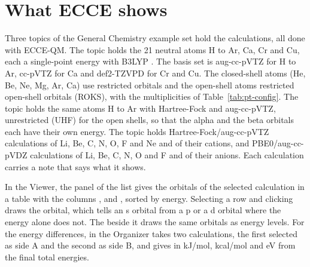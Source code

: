 \section{What ECCE shows}
Three topics of the General Chemistry example set hold the calculations, all done with ECCE-QM.
The topic  holds the 21 neutral atoms H to Ar, Ca, Cr and Cu, each a single-point energy with B3LYP \cite{becke1993}. The basis set is aug-cc-pVTZ \cite{kendall1992,woon1993} for H to Ar, cc-pVTZ for Ca and def2-TZVPD \cite{rappoport2010} for Cr and Cu. The closed-shell atoms (He, Be, Ne, Mg, Ar, Ca) use restricted orbitals and the open-shell atoms restricted open-shell orbitals (ROKS), with the multiplicities of Table~\ref{tab:pt-config}.
The topic  holds the same atoms H to Ar with Hartree-Fock and aug-cc-pVTZ, unrestricted (UHF) for the open shells, so that the alpha and the beta orbitals each have their own energy. The topic  holds Hartree-Fock/aug-cc-pVTZ calculations of Li, Be, C, N, O, F and Ne and of their cations, and PBE0/aug-cc-pVDZ \cite{adamo1999} calculations of Li, Be, C, N, O and F and of their anions.
Each calculation carries a note that says what it shows.

In the Viewer, the  panel of the  list gives the orbitals of the selected calculation in a table with the columns ,  and , sorted by energy. Selecting a row and clicking  draws the orbital, which tells an s orbital from a p or a d orbital where the energy alone does not. The  beside it draws the same orbitals as energy levels.
For the energy differences,  in the Organizer takes two calculations, the first selected as side A and the second as side B, and gives  in kJ/mol, kcal/mol and eV from the final total energies.

